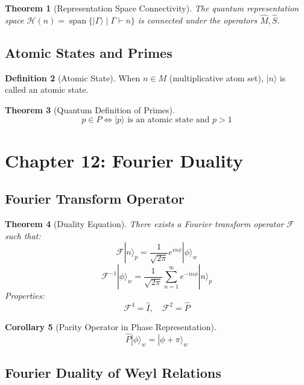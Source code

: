 \documentclass[12pt]{article}
\newtheorem{theorem}{Theorem}[section]
\newtheorem{corollary}[theorem]{Corollary}
\theoremstyle{definition}
\newtheorem{definition}[theorem]{Definition}
\begin{document}
\begin{theorem}[Representation Space Connectivity]
The quantum representation space \(\mathcal{H}(n) = \operatorname{span}\{|\Gamma\rangle \mid \Gamma \vdash n\}\) is connected under the operators \(\hat{M}, \hat{S}\).
\end{theorem}

\subsection{Atomic States and Primes}

\begin{definition}[Atomic State]
When \(n \in M\) (multiplicative atom set), \(|n\rangle\) is called an atomic state.
\end{definition}

\begin{theorem}[Quantum Definition of Primes]
\[
p \in P \iff |p\rangle \text{ is an atomic state and } p>1
\]
\end{theorem}

\section{Chapter 12: Fourier Duality}

\subsection{Fourier Transform Operator}

\begin{theorem}[Duality Equation]
There exists a Fourier transform operator \(\mathcal{F}\) such that:
\[
\mathcal{F}|n\rangle_p = \frac{1}{\sqrt{2\pi}} e^{in\phi}|\phi\rangle_w
\]
\[
\mathcal{F}^{-1}|\phi\rangle_w = \frac{1}{\sqrt{2\pi}} \sum_{n=1}^{\infty} e^{-in\phi} |n\rangle_p
\]
Properties:
\[
\mathcal{F}^4 = \hat{I},\quad \mathcal{F}^2 = \hat{P}
\]
\end{theorem}

\begin{corollary}[Parity Operator in Phase Representation]
\[
\hat{P}|\phi\rangle_w = |\phi + \pi\rangle_w
\]
\end{corollary}

\subsection{Fourier Duality of Weyl Relations}
\end{document}
